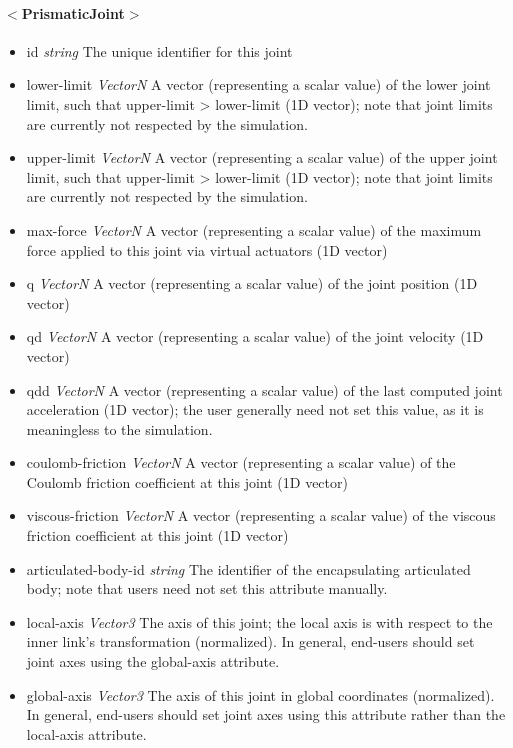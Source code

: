 \documentclass{article}
\begin{document}
\begin{landscape}
\begin{itemize}
\paragraph{$<$PrismaticJoint$>$}
\begin{itemize}
 \item id  \emph{string}  The unique identifier for this joint
 \item lower-limit  \emph{VectorN}  A vector (representing a scalar value) of the lower joint limit, such that upper-limit > lower-limit (1D vector); note that joint limits are currently not respected by the simulation.
 \item upper-limit  \emph{VectorN}  A vector (representing a scalar value) of the upper joint limit, such that upper-limit > lower-limit (1D vector); note that joint limits are currently not respected by the simulation.
 \item max-force  \emph{VectorN}  A vector (representing a scalar value) of the maximum force applied to this joint via virtual actuators (1D vector)
 \item q  \emph{VectorN}  A vector (representing a scalar value) of the joint position (1D vector)
 \item qd  \emph{VectorN}  A vector (representing a scalar value) of the joint velocity (1D vector)
 \item qdd  \emph{VectorN}  A vector (representing a scalar value) of the last computed joint acceleration (1D vector); the user generally need not set this value, as it is meaningless to the simulation.
 \item coulomb-friction  \emph{VectorN}  A vector (representing a scalar value) of the Coulomb friction coefficient at this joint (1D vector)
 \item viscous-friction  \emph{VectorN}  A vector (representing a scalar value) of the viscous friction coefficient at this joint (1D vector)
 \item articulated-body-id  \emph{string} The identifier of the encapsulating articulated body; note that users need not set this attribute manually.
\item local-axis  \emph{Vector3} The axis of this joint; the local axis is with respect to the inner link's transformation (normalized).  In general, end-users should set joint axes using the global-axis attribute.
\item global-axis  \emph{Vector3} The axis of this joint in global coordinates (normalized).  In general, end-users should set joint axes using this attribute rather than the local-axis attribute.

\end{itemize}
\end{itemize}
\end{landscape}
\end{document}
